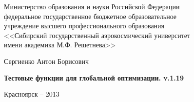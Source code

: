 \thispagestyle{empty}

\begin{center}
Министерство образования и науки Российской Федерации \\ федеральное государственное бюджетное образовательное \\ учреждение высшего профессионального образования \\<<Сибирский государственный аэрокосмический университет \\ имени академика М.Ф. Решетнева>>
\end{center}

\vspace{20mm}


\vspace{30mm}
\begin{center}
{\large Сергиенко Антон Борисович}
\end{center}

\vspace{5mm}
\begin{center}
{\bf \large Тестовые функции для глобальной оптимизации. v.1.19
\par}

\vspace{10mm}


\vspace{10mm}

\end{center}

\vspace{80mm}


\vspace{20mm}
\begin{center}
{Красноярск -- 2013}
\end{center}

\newpage